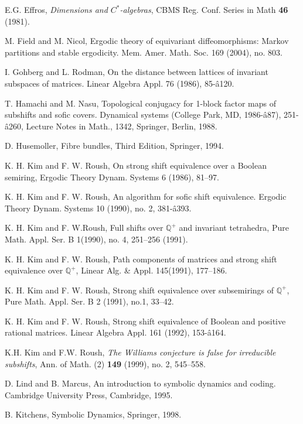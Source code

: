 \documentclass{amsart}
\theoremstyle{definition}
\theoremstyle{remark}
\numberwithin{equation}{section}
\begin{document}
{{\begin{thebibliography}{99}
 E.G. Effros, 
	{\em Dimensions and $C^*$-algebras}, 
	CBMS Reg. Conf. Series in Math {\bf  46} (1981).

 M. Field and M. Nicol, 
Ergodic theory of equivariant diffeomorphisms: 
Markov partitions and stable ergodicity. Mem. Amer. Math. Soc. 169 
(2004), no. 803. 

 I. Gohberg and L. Rodman, 
On the distance between lattices of invariant subspaces of matrices.
Linear Algebra Appl. 76 (1986), 85-â120. 

T. Hamachi and M. Nasu, 
Topological conjugacy for 1-block factor maps 
of subshifts and sofic covers. Dynamical systems (College Park, MD, 1986-â87),
 251-â260,
Lecture Notes in Math., 1342, Springer, Berlin, 1988. 

 D. Husemoller, Fibre bundles, Third Edition, Springer, 1994.

 K. H. Kim and F. W. Roush, 
On strong shift equivalence over a Boolean semiring, Ergodic Theory 
Dynam. Systems 6 (1986), 81--97.

 K. H. Kim and F. W. Roush, 
An algorithm for sofic shift equivalence.
Ergodic Theory Dynam. Systems 10 (1990), no. 2, 381-â393. 

 K. H. Kim and F. W.Roush,
 Full shifts over $\mathbb Q^+$ and invariant tetrahedra, 
Pure Math. Appl. Ser. B 1(1990), no. 4, 251--256 (1991). 

K. H. Kim and F. W. Roush, Path components of matrices and strong shift equivalence over 
$\mathbb Q^+$, Linear Alg. \& Appl. 145(1991), 177--186.

 K. H. Kim and F. W. Roush, 
Strong shift equivalence over subsemirings of $\mathbb Q^+$, 
Pure Math. Appl. Ser. B 2 (1991), no.1, 33--42.

 K. H. Kim and F. W. Roush, 
Strong shift equivalence of Boolean and positive rational matrices.
Linear Algebra Appl. 161 (1992), 153-â164. 

 K.H. Kim and F.W. Roush, 
       {\em The Williams conjecture is false for irreducible subshifts},
       Ann. of Math. (2) {\bf  149}  (1999),  no. 2, 545--558.

 D. Lind and B. Marcus, 
An introduction to symbolic dynamics and coding. 
Cambridge University Press, Cambridge, 1995.

 B. Kitchens, Symbolic Dynamics, Springer, 1998. 


\end{thebibliography}}}
\end{document}
